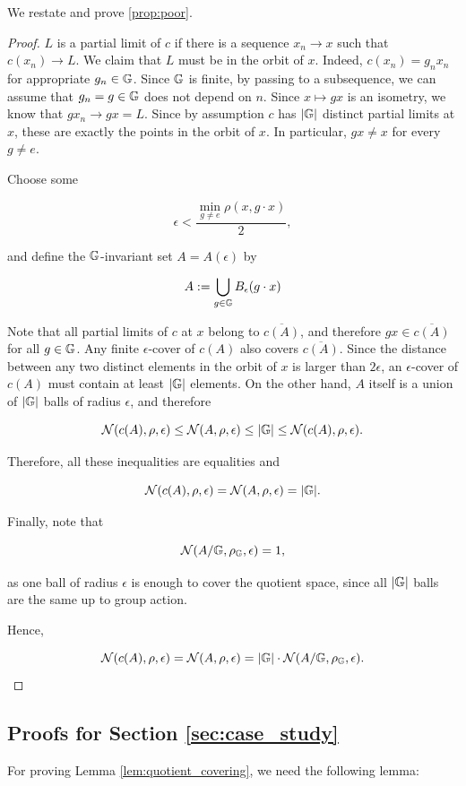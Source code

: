 We restate and prove \ref{prop:poor}.
\poorcanonization*
\begin{proof}
\label{poor_proof}
$L$ is a partial limit of $c$ if there is a sequence $x_n \rightarrow x$ such that $c(x_n)\rightarrow L$. We claim that $L$ must be in the orbit of $x$. Indeed, $c(x_n)=g_nx_n$ for appropriate $g_n \in \mathbb{G}$. Since $\mathbb{G}$ is finite, by passing to a subsequence, we can assume that $g_n=g\in \mathbb{G}$ does not depend on $n$. Since $x\mapsto gx$ is an isometry, we know that $gx_n \rightarrow gx=L$. Since by assumption $c$ has $|\mathbb{G}|$ distinct partial limits at $x$, these are exactly the points in the orbit of $x$. In particular, $gx\neq x$ for every $g\neq e$.

Choose some

$$
\epsilon < \frac{\min_{g \neq e} \rho(x,g\cdot x)}{2},
$$

and define the $\mathbb{G}$-invariant set $A=A(\epsilon)$ by

$$
A := \bigcup_{g \in \mathbb{G}} B_{\epsilon}(g\cdot x)
$$

Note that all partial limits of $c$ at $x$ belong to $\overline{c(A)}$, and therefore $gx\in \overline{c(A)}$ for all $g\in \mathbb{G}$. Any finite $\epsilon$-cover of $c(A)$ also covers $\overline{c(A)}$. Since the distance between any two distinct elements in the orbit of $x$ is larger than $2\epsilon$, an $\epsilon$-cover of $c(A)$ must contain at least $|\mathbb{G}|$ elements. On the other hand, $A$ itself is a union of $|\mathbb{G}|$ balls of radius $\epsilon$, and therefore

$$
\mathcal{N}(c(A),\rho,\epsilon)\leq \mathcal{N}(A,\rho,\epsilon)\leq |\mathbb{G}|
\leq \mathcal{N}(c(A),\rho,\epsilon).
$$

Therefore, all these inequalities are equalities and

$$
\mathcal{N}(c(A),\rho,\epsilon)=\mathcal{N}(A,\rho,\epsilon)=|\mathbb{G}|.
$$

Finally, note that

$$
\mathcal{N}(A/\mathbb{G},\rho_{\mathbb{G}},\epsilon)=1,
$$

as one ball of radius $\epsilon$ is enough to cover the quotient space, since all $|\mathbb{G}|$ balls are the same up to group action.

Hence,

$$
\mathcal{N}(c(A),\rho,\epsilon)
=
\mathcal{N}(A,\rho,\epsilon)
=
|\mathbb{G}|\cdot \mathcal{N}(A/\mathbb{G},\rho_{\mathbb{G}},\epsilon).
$$
\end{proof}

\subsection{Proofs for Section \ref{sec:case_study}}
For proving Lemma \ref{lem:quotient_covering}, we need the following lemma:

